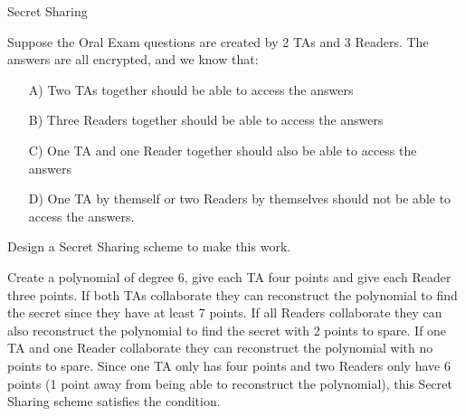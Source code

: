 \begin{homeworkProblem}{Secret Sharing}
    
    Suppose the Oral Exam questions are created by 2 TAs and 3 Readers. The 
    answers are all encrypted, and we know that:

    \begin{itemize}
        \item[A)] Two TAs together should be able to access the answers
        \item[B)] Three Readers together should be able to access the answers
        \item[C)] One TA and one Reader together should also be able to access the answers
        \item[D)] One TA by themself or two Readers by themselves should not be 
        able to access the answers.
    \end{itemize}

    Design a Secret Sharing scheme to make this work.

    \solution

    Create a polynomial of degree 6, give each TA four points and give each Reader
    three points. If both TAs collaborate they can reconstruct the polynomial to
    find the secret since they have at least 7 points. If all Readers collaborate 
    they can also reconstruct the polynomial to find the secret with 2 points to
    spare. If one TA and one Reader collaborate they can reconstruct the polynomial
    with no points to spare. Since one TA only has four points and two Readers only
    have 6 points (1 point away from being able to reconstruct the polynomial), this
    Secret Sharing scheme satisfies the condition. 

\end{homeworkProblem}